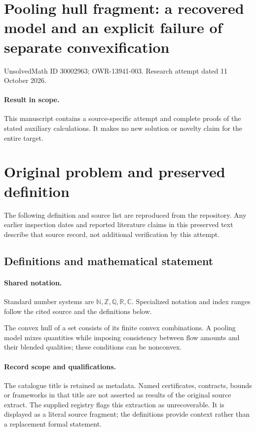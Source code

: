 \documentclass[11pt]{article}
\begin{document}
\section*{Pooling hull fragment: a recovered model and an explicit failure of separate convexification}
\noindent UnsolvedMath ID 30002963; OWR-13941-003. Research attempt dated 11 October 2026.
\paragraph{Result in scope.}This manuscript contains a source-specific attempt and complete proofs of the stated auxiliary calculations. It makes no new solution or novelty claim for the entire target.
\section{Original problem and preserved definition}
The following definition and source list are reproduced from the repository. Any earlier inspection dates and reported literature claims in this preserved text describe that source record, not additional verification by this attempt.
\subsection{Definitions and mathematical statement}

\paragraph{Shared notation.}Standard number systems are $\mathbb N,\mathbb Z,\mathbb Q,\mathbb R,\mathbb C$. Specialized notation and index ranges follow the cited source and the definitions below.


The convex hull of a set consists of its finite convex combinations. A pooling model mixes quantities while imposing consistency between flow amounts and their blended qualities; these conditions can be nonconvex.
\paragraph{Record scope and qualifications.}
The catalogue title is retained as metadata. Named certificates, contracts, bounds or frameworks in that title are not asserted as results of the original source extract.
The supplied registry flags this extraction as unrecoverable. It is displayed as a literal source fragment; the definitions provide context rather than a replacement formal statement.
\end{document}
